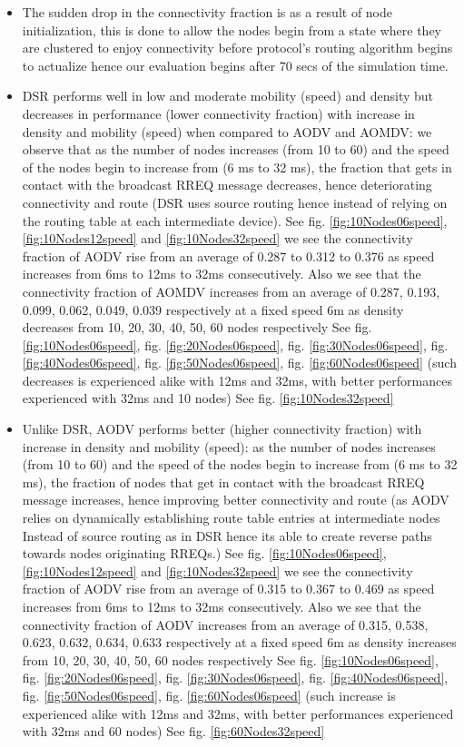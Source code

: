 \documentclass[letterpaper, 10 pt, conference]{ieeeconf}  %
\begin{document}
\begin{itemize}
\item The sudden drop in the connectivity fraction is as a result of node initialization, this is done to allow the nodes begin from a state where they are clustered to enjoy connectivity before protocol's routing algorithm begins to actualize hence our evaluation begins after 70 secs of the simulation time. 

\item DSR  performs well in low and moderate mobility (speed) and density but decreases in performance (lower connectivity fraction) with increase in density and mobility (speed) when compared to AODV and AOMDV: we observe that as the number of nodes increases (from 10 to 60) and the speed of the nodes begin to increase from (6 ms to 32 ms), the fraction that gets in contact with the broadcast RREQ message decreases, hence deteriorating connectivity and route (DSR uses source routing hence instead of relying on the routing table at each intermediate device). See fig. \ref{fig:10Nodes06speed}, \ref{fig:10Nodes12speed} and \ref{fig:10Nodes32speed} we see the connectivity fraction of AODV rise from an average of 0.287 to 0.312 to 0.376 as speed increases from 6ms to 12ms to 32ms consecutively. Also we see that the connectivity fraction of AOMDV increases from an average of 0.287, 0.193, 0.099, 0.062, 0.049, 0.039 respectively at a fixed speed 6m as density decreases from 10, 20, 30, 40, 50, 60 nodes respectively See fig. \ref{fig:10Nodes06speed}, fig. \ref{fig:20Nodes06speed}, fig. \ref{fig:30Nodes06speed}, fig. \ref{fig:40Nodes06speed}, fig. \ref{fig:50Nodes06speed}, fig. \ref{fig:60Nodes06speed} (such decreases is experienced alike with 12ms and 32ms, with better performances experienced with 32ms and 10 nodes) See fig. \ref{fig:10Nodes32speed}

\item Unlike DSR, AODV performs better (higher connectivity fraction) with increase in density and mobility (speed): as the number of nodes increases (from 10 to 60) and the speed of the nodes begin to increase from (6 ms to 32 ms), the fraction of nodes that get in contact with the broadcast RREQ message increases, hence improving better connectivity and route (as AODV relies on dynamically establishing route table entries at intermediate nodes Instead of source routing as in DSR hence its able to create reverse paths towards nodes originating RREQs.) See fig. \ref{fig:10Nodes06speed}, \ref{fig:10Nodes12speed} and \ref{fig:10Nodes32speed} we see the connectivity fraction of AODV rise from an average of 0.315 to 0.367 to 0.469 as speed increases from 6ms to 12ms to 32ms consecutively. Also we see that the connectivity fraction of AODV increases from an average of 0.315, 0.538, 0.623, 0.632, 0.634, 0.633 respectively at a fixed speed 6m as density increases from 10, 20, 30, 40, 50, 60 nodes respectively See fig. \ref{fig:10Nodes06speed}, fig. \ref{fig:20Nodes06speed}, fig. \ref{fig:30Nodes06speed}, fig. \ref{fig:40Nodes06speed}, fig. \ref{fig:50Nodes06speed}, fig. \ref{fig:60Nodes06speed}  (such increase is experienced alike with 12ms and 32ms, with better performances experienced with 32ms and 60 nodes) See fig. \ref{fig:60Nodes32speed}
  

\end{itemize}
\end{document}
